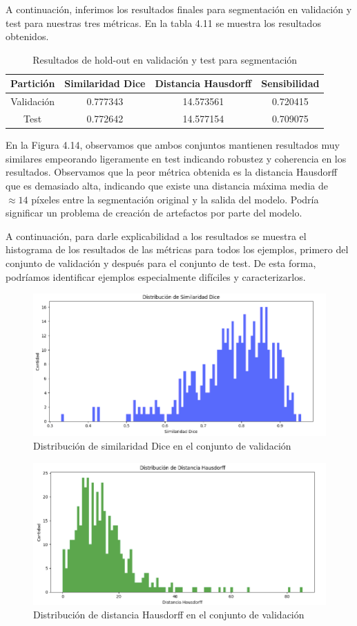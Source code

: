 A continuación, inferimos los resultados finales para segmentación en validación y test para nuestras tres métricas. En la tabla 4.11 se muestra los resultados obtenidos.

\begin{table}[H]
	\centering
	\begin{tabular}{|cccc|}
		\toprule
		Partición & Similaridad Dice & Distancia Hausdorff & Sensibilidad \\ 
		\midrule
		Validación & 0.777343 & 14.573561 & 0.720415 \\ 
		Test & 0.772642 & 14.577154 & 0.709075 \\ 
		\bottomrule
	\end{tabular}
	\caption{Resultados de hold-out en validación y test para segmentación}
	\label{tabla:resultados5}
\end{table}

En la Figura 4.14, observamos que ambos conjuntos mantienen resultados muy similares empeorando ligeramente en test indicando robustez y coherencia en los resultados. Observamos que la peor métrica obtenida es la distancia Hausdorff que es demasiado alta, indicando que existe una distancia máxima media de $\approx 14$ píxeles entre la segmentación original y la salida del modelo. Podría significar un problema de creación de artefactos por parte del modelo.

A continuación, para darle explicabilidad a los resultados se muestra el histograma de los resultados de las métricas para todos los ejemplos, primero del conjunto de validación y después para el conjunto de test. De esta forma, podríamos identificar ejemplos especialmente difíciles y caracterizarlos.
\begin{figure}[H]
	\centering
	\includegraphics[width=0.7\linewidth]{imagenes/dist_dice_val.png}
	\caption{Distribución de similaridad Dice en el conjunto de validación}
\end{figure}

\begin{figure}[H]
	\centering
	\includegraphics[width=0.7\linewidth]{imagenes/dist_haus_val.png}
	\caption{Distribución de distancia Hausdorff en el conjunto de validación}
\end{figure}

